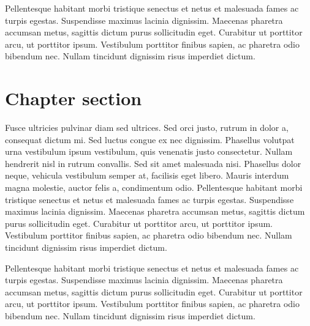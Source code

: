 Pellentesque habitant morbi tristique senectus et netus et malesuada fames ac turpis egestas. Suspendisse maximus lacinia dignissim. Maecenas pharetra accumsan metus, sagittis dictum purus sollicitudin eget. Curabitur ut porttitor arcu, ut porttitor ipsum. Vestibulum porttitor finibus sapien, ac pharetra odio bibendum nec. Nullam tincidunt dignissim risus imperdiet dictum.
\section{Chapter section}
Fusce ultricies pulvinar diam sed ultrices. Sed orci justo, rutrum in dolor a, consequat dictum mi. Sed luctus congue ex nec dignissim. Phasellus volutpat urna vestibulum ipsum vestibulum, quis venenatis justo consectetur. Nullam hendrerit nisl in rutrum convallis. Sed sit amet malesuada nisi. Phasellus dolor neque, vehicula vestibulum semper at, facilisis eget libero. Mauris interdum magna molestie, auctor felis a, condimentum odio. Pellentesque habitant morbi tristique senectus et netus et malesuada fames ac turpis egestas. Suspendisse maximus lacinia dignissim. Maecenas pharetra accumsan metus, sagittis dictum purus sollicitudin eget. Curabitur ut porttitor arcu, ut porttitor ipsum. Vestibulum porttitor finibus sapien, ac pharetra odio bibendum nec. Nullam tincidunt dignissim risus imperdiet dictum.

Pellentesque habitant morbi tristique senectus et netus et malesuada fames ac turpis egestas. Suspendisse maximus lacinia dignissim. Maecenas pharetra accumsan metus, sagittis dictum purus sollicitudin eget. Curabitur ut porttitor arcu, ut porttitor ipsum. Vestibulum porttitor finibus sapien, ac pharetra odio bibendum nec. Nullam tincidunt dignissim risus imperdiet dictum.
